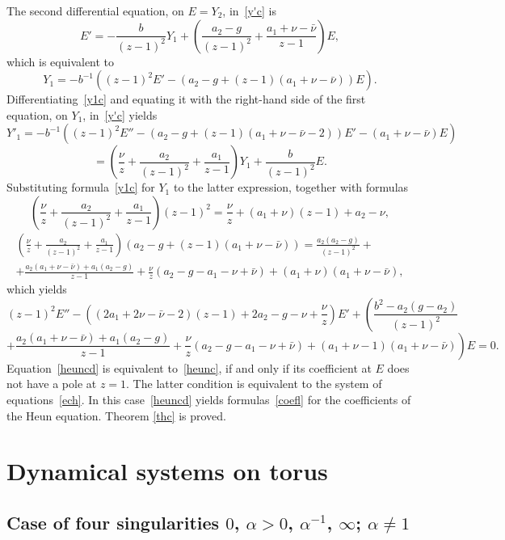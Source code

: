 \documentclass[preprint,12pt]{elsarticle}
\theoremstyle{plain}
\def\a{\alpha}
\numberwithin{equation}{section}
\numberwithin{equation}{section}
\begin{document}
The second differential equation, on $E=Y_2$, in~\eqref{y'c} is  
$$E'=-\frac{b}{(z-1)^2}Y_1+\left(\frac{a_2-g}{(z-1)^2}+\frac{a_1+\nu-\bar\nu}{z-1}\right)E,$$
which is equivalent to 
\begin{equation} Y_1=- b^{-1}\left((z-1)^2E'-(a_2-g+(z-1)(a_1+\nu-\bar\nu))E\right).\label{y1c}\end{equation}
Differentiating~\eqref{y1c} and equating it with the right-hand side of the first equation, on $Y_1$, in~\eqref{y'c}
yields
$$Y'_1= -b^{-1}\left((z-1)^2E''-(a_2-g+(z-1)(a_1+\nu-\bar\nu-2))E'-(a_1+\nu-\bar\nu)E\right)$$
$$=\left(\frac\nu{z}+\frac{a_2}{(z-1)^2}+\frac{a_1}{z-1}\right)Y_1+
\frac{b}{(z-1)^2}E.$$
Substituting formula~\eqref{y1c} for $Y_1$ to the latter expression, together with formulas  
$$\left(\frac\nu{z}+\frac{a_2}{(z-1)^2}+\frac{a_1}{z-1}\right)(z-1)^2=\frac\nu{z}+(a_1+\nu)(z-1)+a_2-\nu,$$
\begin{multline*}
\left(\frac\nu{z}+\frac{a_2}{(z-1)^2}+\frac{a_1}{z-1}\right)(a_2-g+(z-1)(a_1+\nu-\bar\nu))=
\frac{a_2(a_2-g)}{(z-1)^2}+\\+\frac{a_2(a_1+\nu-\bar\nu)+a_1(a_2-g)}{z-1}+\frac{\nu}z(a_2-g-a_1-\nu+\bar\nu)+(a_1+\nu)(a_1+\nu-\bar\nu),
\end{multline*}
which yields
$$(z-1)^2E''-\left((2a_1+2\nu-\bar\nu-2)(z-1)+2a_2-g-\nu+\frac\nu{z}\right)E'+\left(\frac{b^2-a_2(g-a_2)}{(z-1)^2}
\right.$$
\begin{equation}\left.+\frac{a_2(a_1+\nu-\bar\nu)+a_1(a_2-g)}{z-1}+\frac\nu{z}(a_2-g-a_1-\nu+\bar\nu)+
(a_1+\nu-1)(a_1+\nu-\bar\nu)\right)E=0.\label{heuncd}\end{equation}
Equation~\eqref{heuncd} is equivalent to~\eqref{heunc}, if and only if its coefficient at $E$ does not have a pole at $z=1$. The latter condition is equivalent to the system of equations~\eqref{ech}. In this case~\eqref{heuncd} yields formulas~\eqref{coefl} for the coefficients of the Heun equation. Theorem \ref{thc} is proved.







 \section{Dynamical systems on torus}\label{sec:dyn-tor-from-lin-sys}
 
\subsection[Case of four singularities]{Case of four singularities $0$, $\a>0$, $\a^{-1}$, $\infty$; $\alpha\neq1$}\label{subsec:four-sing-proof}
\end{document}
